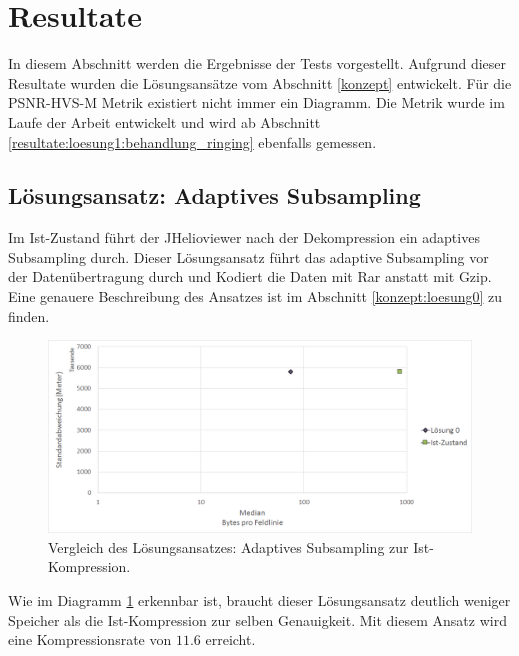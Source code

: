 \section{Resultate}\label{resultate}
In diesem Abschnitt werden die Ergebnisse der Tests vorgestellt. Aufgrund dieser Resultate wurden die Lösungsansätze vom Abschnitt \ref{konzept} entwickelt. Für die PSNR-HVS-M Metrik existiert nicht immer ein Diagramm. Die Metrik wurde im Laufe der Arbeit entwickelt und wird ab Abschnitt \ref{resultate:loesung1:behandlung_ringing} ebenfalls gemessen.

\subsection{Lösungsansatz: Adaptives Subsampling} \label{resultate:loesung0}
Im Ist-Zustand führt der JHelioviewer nach der Dekompression ein adaptives Subsampling durch. Dieser Lösungsansatz führt das adaptive Subsampling vor der Datenübertragung durch und Kodiert die Daten mit Rar anstatt mit Gzip. Eine genauere Beschreibung des Ansatzes ist im Abschnitt \ref{konzept:loesung0} zu finden.
\begin{figure}[!htbp]
	\center
	\includegraphics[width=1\textwidth,keepaspectratio]{./pictures/resultate/loesung0/loesung0_0.png}
	\caption{Vergleich des Lösungsansatzes: Adaptives Subsampling zur Ist-Kompression.}
	\label{resultate:loesung0:loesung0_0}
\end{figure}
Wie im Diagramm \ref{resultate:loesung0:loesung0_0} erkennbar ist, braucht dieser Lösungsansatz deutlich weniger Speicher als die Ist-Kompression zur selben Genauigkeit. Mit diesem Ansatz wird eine Kompressionsrate von $11.6$ erreicht.\\
